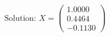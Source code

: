 \documentclass[preview]{standalone}
\begin{document}
\begin{align*}
\text{Solution: } X = \begin{pmatrix} 1.0000 \\ 0.4464 \\ -0.1130 \end{pmatrix}
\end{align*}
\end{document}
